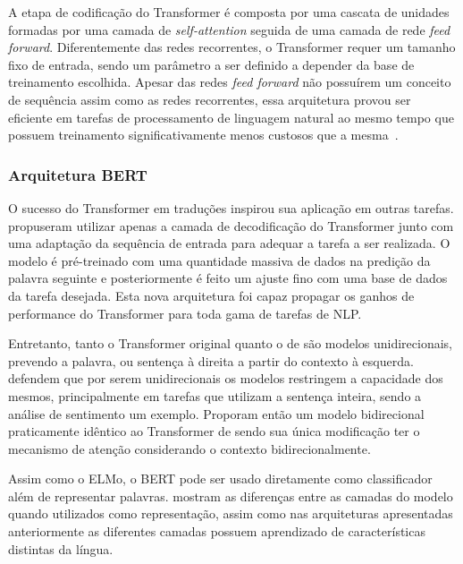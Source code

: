 

A etapa de codificação do Transformer é composta por uma cascata de unidades
formadas por uma camada de \textit{self-attention} seguida de uma camada de
rede \textit{feed forward}.
Diferentemente das redes recorrentes, o Transformer requer um tamanho fixo de
entrada, sendo um parâmetro a ser definido a depender da base de treinamento
escolhida.
Apesar das redes \textit{feed forward} não possuírem um conceito de sequência
assim como as redes recorrentes, essa arquitetura provou ser eficiente em
tarefas de processamento de linguagem natural ao mesmo tempo que possuem
treinamento significativamente menos custosos que a mesma~\cite{vaswani17}.

\subsubsection{Arquitetura BERT}

O sucesso do Transformer em traduções inspirou sua aplicação em outras tarefas.
\citet{radford18} propuseram utilizar apenas a camada de decodificação do
Transformer junto com uma adaptação da sequência de entrada para adequar a
tarefa a ser realizada.
O modelo é pré-treinado com uma quantidade massiva de dados na predição da
palavra seguinte e posteriormente é feito um ajuste fino com uma base de dados
da tarefa desejada.
Esta nova arquitetura foi capaz propagar os ganhos de performance do Transformer
para toda gama de tarefas de NLP.

Entretanto, tanto o Transformer original quanto o de \citet{radford18} são
modelos unidirecionais, prevendo a palavra, ou sentença à direita a partir do
contexto à esquerda.
\citet{devlin18} defendem que por serem unidirecionais os modelos restringem a
capacidade dos mesmos, principalmente em tarefas que utilizam a sentença
inteira, sendo a análise de sentimento um exemplo.
Proporam então um modelo bidirecional praticamente idêntico ao Transformer de
\citet{radford18} sendo sua única modificação ter o mecanismo de atenção
considerando o contexto bidirecionalmente.

Assim como o ELMo, o BERT pode ser usado diretamente como classificador além de
representar palavras.
\citet{devlin18} mostram as diferenças entre as camadas do modelo quando
utilizados como representação, assim como nas arquiteturas apresentadas
anteriormente as diferentes camadas possuem aprendizado de características
distintas da língua.

